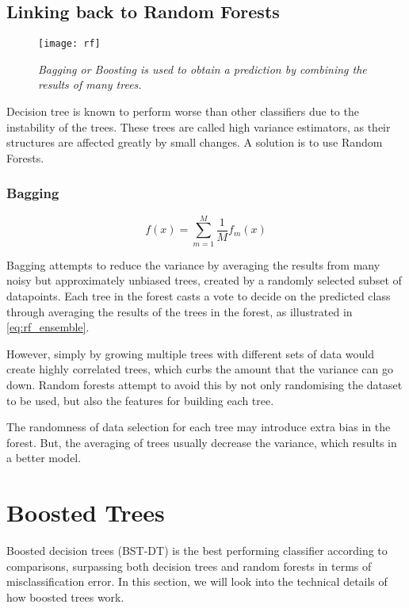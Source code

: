 \subsection{Linking back to Random Forests}

\begin{figure}[H]
  \centering
  \texttt{[image: rf]}
  \caption{\textit{Bagging or Boosting is used to obtain a prediction by combining the results of many trees.}}
  \label{fig:rf}
\end{figure}

Decision tree is known to perform worse than other classifiers due to the instability of the trees. These trees are called high variance estimators, as their structures are affected greatly by small changes. A solution is to use Random Forests. 

\subsubsection{Bagging}

\begin{equation} \label{eq:rf_ensemble}
  f(x) = \sum_{m=1}^M \frac{1}{M}f_m(x)
\end{equation}

Bagging attempts to reduce the variance by averaging the results from many noisy but approximately unbiased trees, created by a randomly selected subset of datapoints. Each tree in the forest casts a vote to decide on the predicted class through averaging the results of the trees in the forest, as illustrated in \autoref{eq:rf_ensemble}.

However, simply by growing multiple trees with different sets of data would create highly correlated trees, which curbs the amount that the variance can go down. Random forests attempt to avoid this by not only randomising the dataset to be used, but also the features for building each tree. 

The randomness of data selection for each tree may introduce extra bias in the forest. But, the averaging of trees usually decrease the variance, which results in a better model.


\newpage
\section{Boosted Trees} \label{sec:boosted}
Boosted decision trees (BST-DT) is the best performing classifier according to  comparisons, surpassing both decision trees and random forests in terms of misclassification error. In this section, we will look into the technical details of how boosted trees work.

